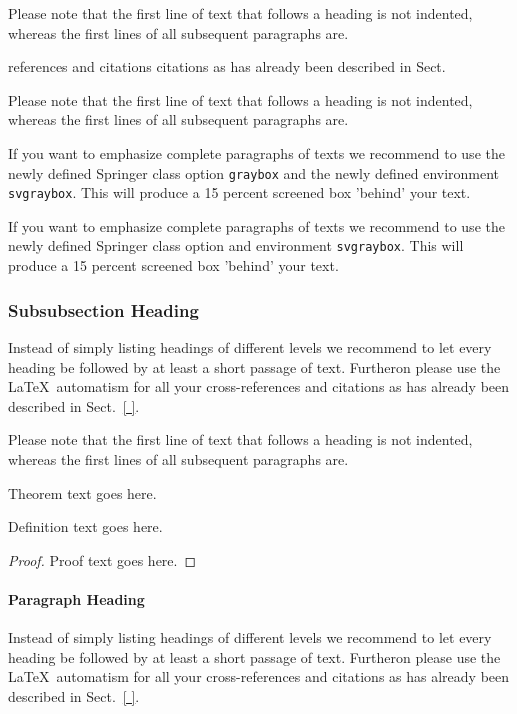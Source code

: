 Please note that the first line of text that follows a heading is not indented, whereas the first lines of all subsequent paragraphs are.

references and citations citations as has already been described in Sect.

Please note that the first line of text that follows a heading is not indented, whereas the first lines of all subsequent paragraphs are.

\begin{svgraybox}
If you want to emphasize complete paragraphs of texts we recommend to use the newly defined Springer class option \verb|graybox| and the newly defined environment \verb|svgraybox|. This will produce a 15 percent screened box 'behind' your text.

If you want to emphasize complete paragraphs of texts we recommend to use the newly defined Springer class option and environment \verb|svgraybox|. This will produce a 15 percent screened box 'behind' your text.
\end{svgraybox}


\subsubsection{Subsubsection Heading}
Instead of simply listing headings of different levels we recommend to let every heading be followed by at least a short passage of text. Furtheron please use the \LaTeX\ automatism for all your cross-references and citations as has already been described in Sect.~\ref{ }.

Please note that the first line of text that follows a heading is not indented, whereas the first lines of all subsequent paragraphs are.

\begin{theorem}
Theorem text goes here.
\end{theorem}
%
%
\begin{definition}
Definition text goes here.
\end{definition}

\begin{proof}
Proof text goes here.
\end{proof}

\paragraph{Paragraph Heading} %
Instead of simply listing headings of different levels we recommend to let every heading be followed by at least a short passage of text. Furtheron please use the \LaTeX\ automatism for all your cross-references and citations as has already been described in Sect.~\ref{ }.


